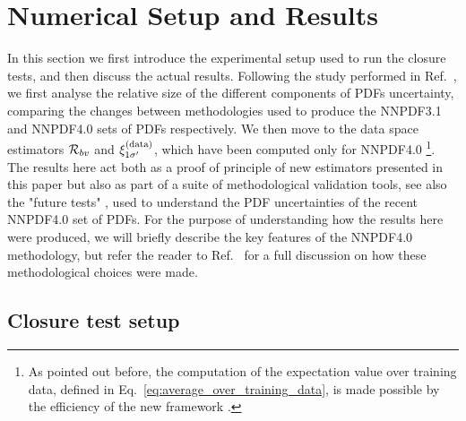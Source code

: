 \section{Numerical Setup and Results}
\label{sec:numerical-results}

In this section we first introduce the experimental setup used to run the
closure tests, and then discuss the actual results. Following the study
performed in Ref.~\cite{nnpdf30}, we first analyse the relative size of the
different components of PDFs uncertainty, comparing the changes between methodologies
used to produce the NNPDF3.1 \cite{Ball_2017} and
NNPDF4.0 \cite{NNPDF40} sets of PDFs respectively. We then move to the data
space estimators $\mathcal{R}_{bv}$ and $\xi^{(\rm data)}_{1 {{\sigma}^{\prime}}}$, which have been computed
only for NNPDF4.0 \footnote{As pointed out before, the computation of the
expectation value over training data, defined in
Eq.~\ref{eq:average_over_training_data}, is made possible by the efficiency of
the new framework \cite{nnpdf40code}.}. The results here act both as a proof of
principle of new estimators presented in this paper but also as part of a suite
of methodological validation tools, see also the "future tests"
\cite{Cruz_Martinez_2021}, used to understand the PDF uncertainties of the
recent NNPDF4.0 set of PDFs. For the purpose of understanding how the results
here were produced, we will briefly describe the key features of the NNPDF4.0
methodology, but refer the reader to Ref.~\cite{NNPDF40} for a full discussion on how these
methodological choices were made.

\subsection{Closure test setup}

